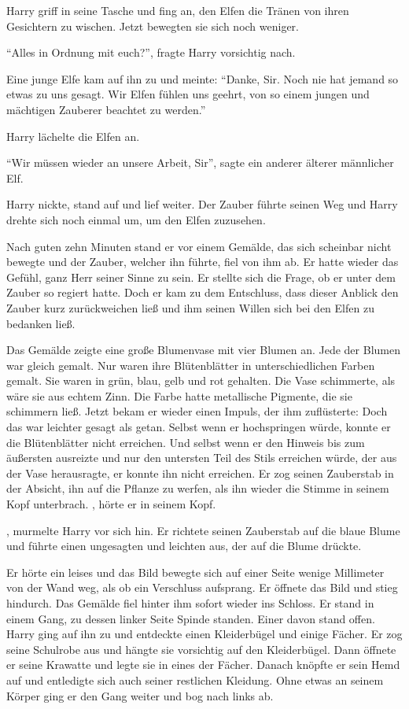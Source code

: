 Harry griff in seine Tasche und fing an, den Elfen die Tränen von ihren Gesichtern zu wischen. Jetzt bewegten sie sich noch weniger.

\enquote{Alles in Ordnung mit euch?}, fragte Harry vorsichtig nach.

Eine junge Elfe kam auf ihn zu und meinte: \enquote{Danke, Sir. Noch nie hat jemand so etwas zu uns gesagt. Wir Elfen fühlen uns geehrt, von so einem jungen und mächtigen Zauberer beachtet zu werden.}

Harry lächelte die Elfen an.

\enquote{Wir müssen wieder an unsere Arbeit, Sir}, sagte ein anderer älterer männlicher Elf.

Harry nickte, stand auf und lief weiter. Der Zauber führte seinen Weg und Harry drehte sich noch einmal um, um den Elfen zuzusehen.

Nach guten zehn Minuten stand er vor einem Gemälde, das sich scheinbar nicht bewegte und der Zauber, welcher ihn führte, fiel von ihm ab. Er hatte wieder das Gefühl, ganz Herr seiner Sinne zu sein. Er stellte sich die Frage, ob er unter dem Zauber so regiert hatte. Doch er kam zu dem Entschluss, dass dieser Anblick den Zauber kurz zurückweichen ließ und ihm seinen Willen \gst sich bei den Elfen zu bedanken \gst ließ.

Das Gemälde zeigte eine große Blumenvase mit vier Blumen an. Jede der Blumen war gleich gemalt. Nur waren ihre Blütenblätter in unterschiedlichen Farben gemalt. Sie waren in grün, blau, gelb und rot gehalten. Die Vase schimmerte, als wäre sie aus echtem Zinn. Die Farbe hatte metallische Pigmente, die sie schimmern ließ. Jetzt bekam er wieder einen Impuls, der ihm zuflüsterte:  Doch das war leichter gesagt als getan. Selbst wenn er hochspringen würde, konnte er die Blütenblätter nicht erreichen. Und selbst wenn er den Hinweis bis zum äußersten ausreizte und nur den untersten Teil des Stils erreichen würde, der aus der Vase herausragte, er konnte ihn nicht erreichen. Er zog seinen Zauberstab in der Absicht, ihn auf die Pflanze zu werfen, als ihn wieder die Stimme in seinem Kopf unterbrach. , hörte er in seinem Kopf.

, murmelte Harry vor sich hin. Er richtete seinen Zauberstab auf die blaue Blume und führte einen ungesagten und leichten  aus, der auf die Blume drückte.

Er hörte ein leises  und das Bild bewegte sich auf einer Seite wenige Millimeter von der Wand weg, als ob ein Verschluss aufsprang. Er öffnete das Bild und stieg hindurch. Das Gemälde fiel hinter ihm sofort wieder ins Schloss. Er stand in einem Gang, zu dessen linker Seite Spinde standen. Einer davon stand offen. Harry ging auf ihn zu und entdeckte einen Kleiderbügel und einige Fächer. Er zog seine Schulrobe aus und hängte sie vorsichtig auf den Kleiderbügel. Dann öffnete er seine Krawatte und legte sie in eines der Fächer. Danach knöpfte er sein Hemd auf und entledigte sich auch seiner restlichen Kleidung. Ohne etwas an seinem Körper ging er den Gang weiter und bog nach links ab.

